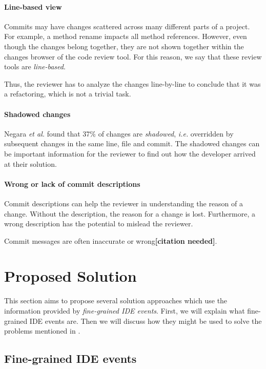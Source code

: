 \documentclass[conference,a4paper]{IEEEtran}
\newcommand{\citeneeded}{\textbf{{[}citation needed{]}}}
\begin{document}
\paragraph{Line-based view}

Commits may have changes scattered across many different parts of a
project. For example, a method rename impacts all method
references. However, even though the changes belong together, they are
not shown together within the changes browser of the code review
tool. For this reason, we say that these review tools are
\textit{line-based}.

Thus, the reviewer has to analyze the changes line-by-line to conclude
that it was a refactoring, which is not a trivial task.

\paragraph{Shadowed changes}

Negara \textit{et al.} found that 37\% of changes are
\textit{shadowed}, \textit{i.e.} overridden by subsequent changes in
the same line, file and commit\cite{Nega12a}. The shadowed changes can
be important information for the reviewer to find out how the
developer arrived at their solution.

\paragraph{Wrong or lack of commit descriptions}

Commit descriptions can help the reviewer in understanding the reason
of a change. Without the description, the reason for a change is
lost. Furthermore, a wrong description has the potential to mislead
the reviewer.

Commit messages are often inaccurate or wrong\citeneeded{}.

\section{Proposed Solution}
\label{sec:proposed-solution}
This section aims to propose several solution approaches which use the
information provided by \textit{fine-grained IDE events}. First, we
will explain what fine-grained IDE events are. Then we will discuss
how they might be used to solve the problems mentioned in
.

\subsection{Fine-grained IDE events}
\label{sec:fine-grained-ide}
\end{document}
